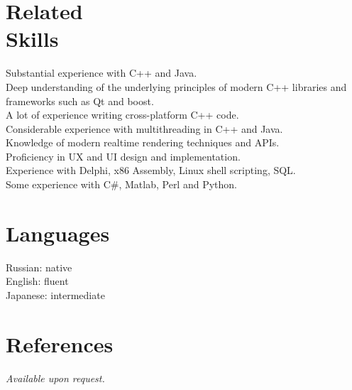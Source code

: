 \documentclass[margin,line]{CV}
\begin{document}
\begin{resume}
    \section{\mysidestyle Related\\Skills}
    Substantial experience with C++ and Java. \\
	Deep understanding of the underlying principles of modern C++ libraries and frameworks such as Qt and boost. \\
    A lot of experience writing cross-platform C++ code. \\
    Considerable experience with multithreading in C++ and Java. \\
    Knowledge of modern realtime rendering techniques and APIs. \\
    Proficiency in UX and UI design and implementation. \\
    Experience with Delphi, x86 Assembly, Linux shell scripting, SQL. \\
    Some experience with C\#, Matlab, Perl and Python. \\


    \section{\mysidestyle Languages}
    Russian: native \\
    English: fluent \\
    Japanese: intermediate


    \section{\mysidestyle References}
    {\sl Available upon request.}

\end{resume}
\end{document}
